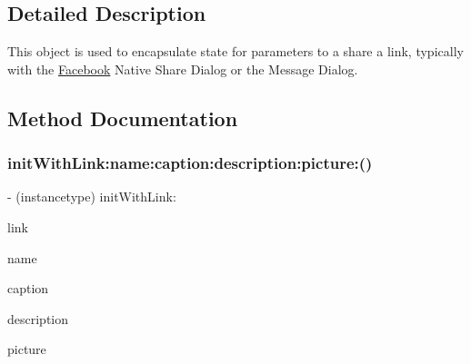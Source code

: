 \subsection{Detailed Description}
This object is used to encapsulate state for parameters to a share a link, typically with the \hyperlink{interfaceFacebook}{Facebook} Native Share Dialog or the Message Dialog. 

\subsection{Method Documentation}
\mbox{\label{interfaceFBLinkShareParams_a6c9c0dddf0644517ce50aa6204dea8c5}} 
\subsubsection{\texorpdfstring{init\+With\+Link\+:name\+:caption\+:description\+:picture\+:()}{initWithLink:name:caption:description:picture:()}\hspace{0.1cm}{\footnotesize\ttfamily [1/5]}}
{\footnotesize\ttfamily -\/ (instancetype) init\+With\+Link\+: \begin{DoxyParamCaption}\item[{(N\+S\+U\+RL $\ast$)}]{link }\item[{name:(N\+S\+String $\ast$)}]{name }\item[{caption:(N\+S\+String $\ast$)}]{caption }\item[{description:(N\+S\+String $\ast$)}]{description }\item[{picture:(N\+S\+U\+RL $\ast$)}]{picture }\end{DoxyParamCaption}}

